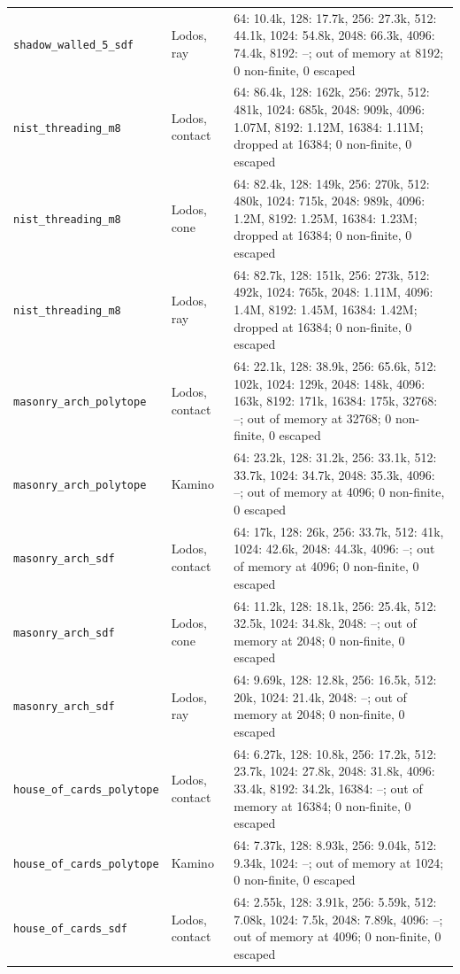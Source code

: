 \begin{longtable}{@{}llp{9.5cm}@{}}
\texttt{shadow\_walled\_5\_sdf} & Lodos, ray & 64: 10.4k, 128: 17.7k, 256: 27.3k, 512: 44.1k, 1024: 54.8k, 2048: 66.3k, 4096: 74.4k, 8192: --; out of memory at 8192; 0 non-finite, 0 escaped \\
\texttt{nist\_threading\_m8} & Lodos, contact & 64: 86.4k, 128: 162k, 256: 297k, 512: 481k, 1024: 685k, 2048: 909k, 4096: 1.07M, 8192: 1.12M, 16384: 1.11M; dropped at 16384; 0 non-finite, 0 escaped \\
\texttt{nist\_threading\_m8} & Lodos, cone & 64: 82.4k, 128: 149k, 256: 270k, 512: 480k, 1024: 715k, 2048: 989k, 4096: 1.2M, 8192: 1.25M, 16384: 1.23M; dropped at 16384; 0 non-finite, 0 escaped \\
\texttt{nist\_threading\_m8} & Lodos, ray & 64: 82.7k, 128: 151k, 256: 273k, 512: 492k, 1024: 765k, 2048: 1.11M, 4096: 1.4M, 8192: 1.45M, 16384: 1.42M; dropped at 16384; 0 non-finite, 0 escaped \\
\texttt{masonry\_arch\_polytope} & Lodos, contact & 64: 22.1k, 128: 38.9k, 256: 65.6k, 512: 102k, 1024: 129k, 2048: 148k, 4096: 163k, 8192: 171k, 16384: 175k, 32768: --; out of memory at 32768; 0 non-finite, 0 escaped \\
\texttt{masonry\_arch\_polytope} & Kamino & 64: 23.2k, 128: 31.2k, 256: 33.1k, 512: 33.7k, 1024: 34.7k, 2048: 35.3k, 4096: --; out of memory at 4096; 0 non-finite, 0 escaped \\
\texttt{masonry\_arch\_sdf} & Lodos, contact & 64: 17k, 128: 26k, 256: 33.7k, 512: 41k, 1024: 42.6k, 2048: 44.3k, 4096: --; out of memory at 4096; 0 non-finite, 0 escaped \\
\texttt{masonry\_arch\_sdf} & Lodos, cone & 64: 11.2k, 128: 18.1k, 256: 25.4k, 512: 32.5k, 1024: 34.8k, 2048: --; out of memory at 2048; 0 non-finite, 0 escaped \\
\texttt{masonry\_arch\_sdf} & Lodos, ray & 64: 9.69k, 128: 12.8k, 256: 16.5k, 512: 20k, 1024: 21.4k, 2048: --; out of memory at 2048; 0 non-finite, 0 escaped \\
\texttt{house\_of\_cards\_polytope} & Lodos, contact & 64: 6.27k, 128: 10.8k, 256: 17.2k, 512: 23.7k, 1024: 27.8k, 2048: 31.8k, 4096: 33.4k, 8192: 34.2k, 16384: --; out of memory at 16384; 0 non-finite, 0 escaped \\
\texttt{house\_of\_cards\_polytope} & Kamino & 64: 7.37k, 128: 8.93k, 256: 9.04k, 512: 9.34k, 1024: --; out of memory at 1024; 0 non-finite, 0 escaped \\
\texttt{house\_of\_cards\_sdf} & Lodos, contact & 64: 2.55k, 128: 3.91k, 256: 5.59k, 512: 7.08k, 1024: 7.5k, 2048: 7.89k, 4096: --; out of memory at 4096; 0 non-finite, 0 escaped \\

\end{longtable}
